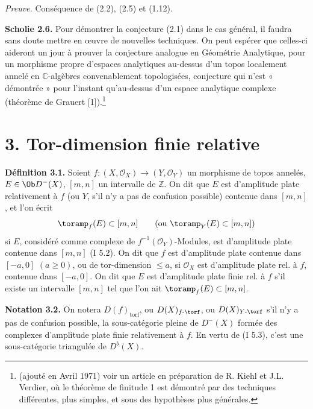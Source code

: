 \emph{Preuve.} Conséquence de (2.2), (2.5) et (1.12).

\textbf{Scholie 2.6.} Pour démontrer la conjecture (2.1) dans le cas général, il faudra sans doute mettre en œuvre de nouvelles techniques. On peut espérer que celles-ci aideront un jour à prouver la conjecture analogue en Géométrie Analytique, pour un morphisme propre d'espaces analytiques au-dessus d'un topos localement annelé en \(\mathbb C\)-algèbres convenablement topologisées, conjecture qui n'est « démontrée » pour l'instant qu'au-dessus d'un espace analytique complexe (théorème de Grauert [1]).\footnote{(ajouté en Avril 1971) voir un article en préparation de R. Kiehl et J.L. Verdier, où le théorème de finitude 1 est démontré par des techniques différentes, plus simples, et sous des hypothèses plus générales.}

\section*{3. Tor-dimension finie relative}

\textbf{Définition 3.1.} Soient \(f:(X,\mathcal O_X)\longrightarrow(Y,\mathcal O_Y)\) un morphisme de topos annelés, \(E\in\Ob D^{-}(X)\), \([m,n]\) un intervalle de \(\mathbb Z\). On dit que \(E\) est d'amplitude plate relativement à \(f\) (ou \(Y\), s'il n'y a pas de confusion possible) contenue dans \([m,n]\), et l'on écrit
\[
  \toramp_f(E)\subset[m,n]\qquad(\text{ou }\toramp_Y(E)\subset[m,n])
\]
si \(E\), considéré comme complexe de \(f^{-1}(\mathcal O_Y)\)-Modules, est d'amplitude plate contenue dans \([m,n]\) (I 5.2). On dit que \(f\) est d'amplitude plate contenue dans \([-a,0]\) \((a\geq0)\), ou de tor-dimension \(\leq a\), si \(\mathcal O_X\) est d'amplitude plate rel. à \(f\), contenue dans \([-a,0]\). On dit que \(E\) est d'amplitude plate finie rel. à \(f\) s'il existe un intervalle \([m,n]\) tel que l'on ait \(\toramp_f(E)\subset[m,n]\).

\textbf{Notation 3.2.} On notera \(D(f)_{\mathrm{torf}}\), ou \(D(X)_{f\text{-}\torf}\), ou \(D(X)_{Y\text{-}\torf}\) s'il n'y a pas de confusion possible, la sous-catégorie pleine de \(D^{-}(X)\) formée des complexes d'amplitude plate finie relativement à \(f\). En vertu de (I 5.3), c'est une sous-catégorie triangulée de \(D^b(X)\).

